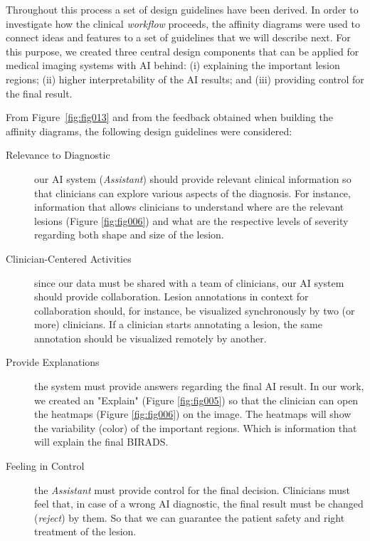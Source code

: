 Throughout this process a set of design guidelines have been derived.
In order to investigate how the clinical {\it workflow} proceeds, the affinity diagrams were used to connect ideas and features to a set of guidelines that we will describe next.
For this purpose, we created three central design components that can be applied for medical imaging systems with AI behind: (i) explaining the important lesion regions; (ii) higher interpretability of the AI results; and (iii) providing control for the final result.

\clearpage

\noindent
From Figure~\ref{fig:fig013} and from the feedback obtained when building the affinity diagrams, the following design guidelines were considered:

\hfill

\begin{description}
\item[Relevance to Diagnostic] our AI system ({\it Assistant}) should provide relevant clinical information so that clinicians can explore various aspects of the diagnosis. For instance, information that allows clinicians to understand where are the relevant lesions (Figure \ref{fig:fig006}) and what are the respective levels of severity regarding both shape and size of the lesion.

\item[Clinician-Centered Activities] since our data must be shared with a team of clinicians, our AI system should provide collaboration. Lesion annotations in context for collaboration should, for instance, be visualized synchronously by two (or more) clinicians. If a clinician starts annotating a lesion, the same annotation should be visualized remotely by another.

\item[Provide Explanations] the system must provide answers regarding the final AI result. In our work, we created an "Explain" (Figure \ref{fig:fig005}) so that the clinician can open the heatmaps (Figure \ref{fig:fig006}) on the image. The heatmaps will show the variability (color) of the important regions. Which is information that will explain the final BIRADS.

\item[Feeling in Control] the {\it Assistant} must provide control for the final decision. Clinicians must feel that, in case of a wrong AI diagnostic, the final result must be changed ({\it reject}) by them. So that we can guarantee the patient safety and right treatment of the lesion.
\end{description}


